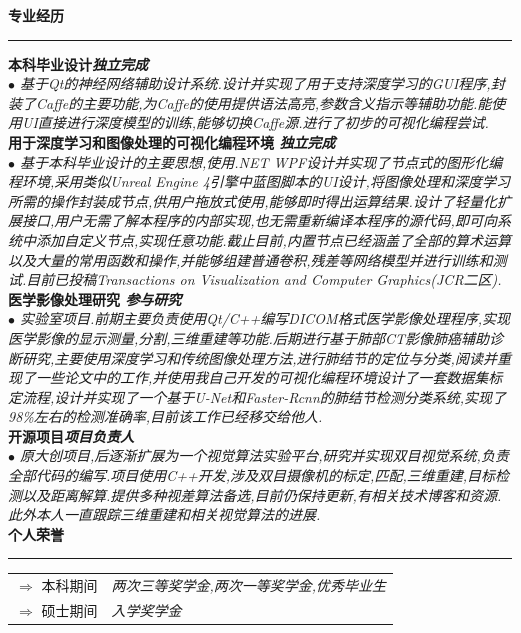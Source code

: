 \documentclass[a4paper,12pt,final]{memoir}
\newcommand{\myThemeColor}{RoyalBlue}
\newcommand{\SmallSep}{\vspace{0.9em}}
\newcommand{\CVSection}[1]
	{\Large\textbf{#1}\par
	\vspace{0.2cm}\normalsize\normalfont}
\newcommand{\CVItem}[1]
	{\textbf{\color{\myThemeColor} #1}}
\begin{document}
\begin{CJK*}{UTF8}{gbsn}
\CVSection{专业经历}
\hrule
\SmallSep
\CVItem{本科毕业设计\hfill\emph{独立完成}}\\
\textit{$\bullet$ 基于Qt的神经网络辅助设计系统.设计并实现了用于支持深度学习的GUI程序,封装了Caffe的主要功能,为Caffe的使用提供语法高亮,参数含义指示等辅助功能.能使用UI直接进行深度模型的训练,能够切换Caffe源.进行了初步的可视化编程尝试.} 
\\
\CVItem{用于深度学习和图像处理的可视化编程环境 \hfill\emph{独立完成}}\\
\textit{$\bullet$ 基于本科毕业设计的主要思想,使用.NET WPF设计并实现了节点式的图形化编程环境,采用类似Unreal Engine 4引擎中蓝图脚本的UI设计,将图像处理和深度学习所需的操作封装成节点,供用户拖放式使用,能够即时得出运算结果.设计了轻量化扩展接口,用户无需了解本程序的内部实现,也无需重新编译本程序的源代码,即可向系统中添加自定义节点,实现任意功能.截止目前,内置节点已经涵盖了全部的算术运算以及大量的常用函数和操作,并能够组建普通卷积,残差等网络模型并进行训练和测试.目前已投稿Transactions on Visualization and Computer Graphics(JCR二区).}
\\
\CVItem{医学影像处理研究 \hfill\emph{参与研究}}\\
\textit{$\bullet$ 实验室项目.前期主要负责使用Qt/C++编写DICOM格式医学影像处理程序,实现医学影像的显示测量,分割,三维重建等功能.后期进行基于肺部CT影像肺癌辅助诊断研究,主要使用深度学习和传统图像处理方法,进行肺结节的定位与分类,阅读并重现了一些论文中的工作,并使用我自己开发的可视化编程环境设计了一套数据集标定流程,设计并实现了一个基于U-Net和Faster-Rcnn的肺结节检测分类系统,实现了98\%左右的检测准确率,目前该工作已经移交给他人.}
\\
\CVItem{开源项目\hfill\emph{项目负责人}}\\
\textit{$\bullet$ 原大创项目,后逐渐扩展为一个视觉算法实验平台,研究并实现双目视觉系统,负责全部代码的编写.项目使用C++开发,涉及双目摄像机的标定,匹配,三维重建,目标检测以及距离解算.提供多种视差算法备选,目前仍保持更新,有相关技术博客和资源.此外本人一直跟踪三维重建和相关视觉算法的进展.} 
\\

\CVSection{个人荣誉}
\hrule
\SmallSep
	\begin{tabular}{l|l}
		$\Rightarrow$ 本科期间&\textit{两次三等奖学金,两次一等奖学金,优秀毕业生}\footnotesize\\
		$\Rightarrow$ 硕士期间&\textit{入学奖学金}\\
	\end{tabular}

\end{CJK*}
\end{document}
